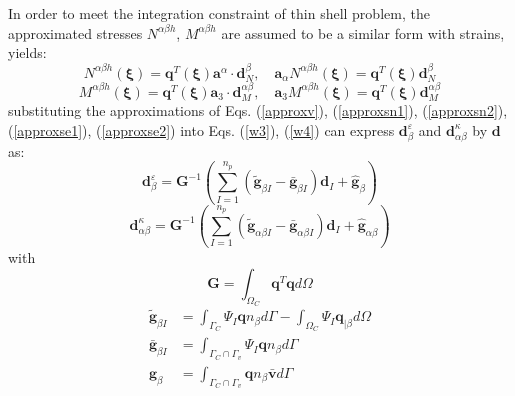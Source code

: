 In order to meet the integration constraint of thin shell problem, the approximated stresses $N^{\alpha\beta h}$, $M^{\alpha\beta h}$ are assumed to be a similar form with strains, yields:
\begin{equation}\label{approxse1}
N^{\alpha\beta h}(\boldsymbol \xi) = \boldsymbol q^T(\boldsymbol \xi) \boldsymbol a^\alpha \cdot \boldsymbol d^{\beta}_N,\quad
\boldsymbol a_\alpha N^{\alpha\beta h}(\boldsymbol \xi) = \boldsymbol q^T(\boldsymbol \xi) \boldsymbol d_N^\beta
\end{equation}
\begin{equation}\label{approxse2}
    M^{\alpha\beta h}(\boldsymbol \xi) = \boldsymbol q^T(\boldsymbol \xi) \boldsymbol a_3 \cdot \boldsymbol d^{\alpha\beta}_M,\quad
    \boldsymbol a_3 M^{\alpha\beta h}(\boldsymbol \xi) = \boldsymbol q^T(\boldsymbol \xi) \boldsymbol d^{\alpha\beta}_M
\end{equation}
substituting the approximations of Eqs. (\ref{approxv}), (\ref{approxsn1}), (\ref{approxsn2}), (\ref{approxse1}), (\ref{approxse2}) into Eqs. (\ref{w3}), (\ref{w4}) can express $\boldsymbol d^\varepsilon_\beta$ and $\boldsymbol d^\kappa_{\alpha\beta}$ by $\boldsymbol d$ as:
\begin{equation}\label{depsilon}
\boldsymbol d^\varepsilon_\beta = \boldsymbol G^{-1} \left (\sum_{I=1}^{n_p}(\tilde{\boldsymbol g}_{\beta I} - \bar{\boldsymbol g}_{\beta I}) \boldsymbol d_I + \hat{\boldsymbol g}_\beta \right )
\end{equation}
\begin{equation}\label{dkappa}
\boldsymbol d^\kappa_{\alpha\beta} = \boldsymbol G^{-1} \left (\sum_{I=1}^{n_p}(\tilde{\boldsymbol g}_{\alpha\beta I} - \bar{\boldsymbol g}_{\alpha\beta I})\boldsymbol d_I + \hat{\boldsymbol g}_{\alpha\beta} \right )
\end{equation}
with
\begin{equation}
\boldsymbol G = \int_{\Omega_C} \boldsymbol q^T \boldsymbol q d\Omega
\end{equation}
\begin{subequations}\label{gn}
\begin{align}
\tilde{\boldsymbol g}_{\beta I} &= \int_{\Gamma_C} \Psi_I \boldsymbol q n_\beta d\Gamma
- \int_{\Omega_C} \Psi_I \boldsymbol q_{\vert \beta} d\Omega \\
\bar{\boldsymbol g}_{\beta I} &= \int_{\Gamma_C\cap\Gamma_v} \Psi_I \boldsymbol q n_\beta d\Gamma \\
\hat{\boldsymbol g}_{\beta} &= \int_{\Gamma_C\cap\Gamma_v} \boldsymbol q n_\beta \bar{\boldsymbol v} d\Gamma 
\end{align}
\end{subequations}
